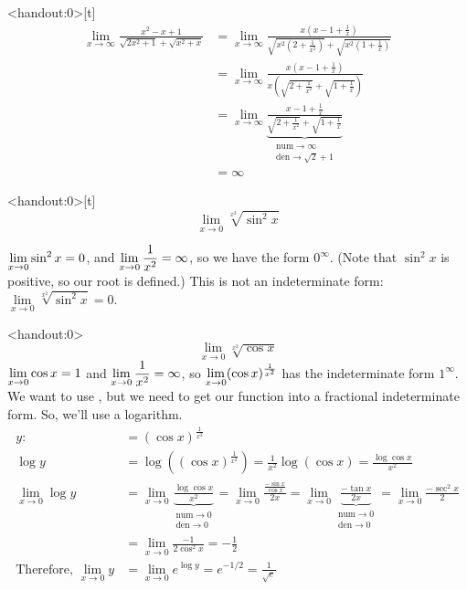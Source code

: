 \begin{frame}<handout:0>[t]
\color{answercolor}
\begin{align*}
\lim_{x \to \infty}
\frac{x^2-x+1}{\sqrt{2x^2+1}+\sqrt{x^2+x}}&=\lim_{x \to \infty}
\frac{x\left(x-1+\frac{1}{x}\right)}{\sqrt{x^2(2+\frac{1}{x^2})}+\sqrt{x^2(1+\frac{1}{x})}}\\
&=\lim_{x \to \infty}
\frac{x\left(x-1+\frac{1}{x}\right)}{x\left(\sqrt{2+\frac{1}{x^2}}+\sqrt{1+\frac{1}{x}}\right)}\\
&=\lim_{x \to \infty}
\underbrace{\frac{x-1+\frac{1}{x}}{\sqrt{2+\frac{1}{x^2}}+\sqrt{1+\frac{1}{x}}}}_{\substack
	{\mathrm{num}\to \infty\\
	 \mathrm{den}\to \sqrt{2}+1}}\\
&=\infty
\end{align*}
\color{answercolor}

\end{frame}
\begin{frame}<handout:0>[t]
\[\lim_{x \to 0}\sqrt[x^2]{\sin^2x}\]\pause


\color{answercolor}
 $\displaystyle\lim_{x \to 0} \sin^2 x = 0$, and $\displaystyle\lim_{x \to 0}\frac{1}{x^2}=\infty$, so we have the form $0^\infty$. (Note that $\sin^2 x$ is positive, so our root is defined.) This is not an indeterminate form: $\lim\limits_{x \to 0}\sqrt[x^2]{\sin^2 x}=0$.
\end{frame}
\begin{frame}<handout:0>
\[\lim_{x \to 0}\sqrt[x^2]{\cos x}\]\pause
\color{answercolor}
 $\displaystyle\lim_{x \to 0} \cos x =1$ and $\displaystyle\lim_{x \to 0}\frac{1}{x^2}=\infty$, so $\displaystyle\lim_{x \to 0}(\cos x)^{\frac{1}{x^2}}$ has the indeterminate form $1^\infty$. We want to use \hosp, but we need to get our function into a fractional indeterminate form. So, we'll use a logarithm.
\begin{align*}
y:&=(\cos x)^{\frac{1}{x^2}}\\
\log y &= \log \left((\cos x)^{\frac{1}{x^2}}\right)
=\frac{1}{x^2}\log(\cos x)=\frac{\log \cos x}{x^2}\\
\lim_{x \to 0}\log y &=\lim_{x \to 0}\underbrace{\frac{\log \cos x}{x^2}}_{\substack
	{\mathrm{num}\to0\\
	 \mathrm{den}\to 0}}
	=
	\lim_{x \to 0} \frac{\frac{-\sin x}{\cos x}}{2x}=
	\lim_{x \to 0} \underbrace{\frac{-\tan x}{2x}}_{\substack
	{\mathrm{num}\to0\\
	 \mathrm{den}\to 0}}
	=
	\lim_{x \to 0}\frac{-\sec^2x}{2}\\
	&=\lim_{x \to 0}\frac{-1}{2\cos^2 x}=-\frac{1}{2}\\
\mbox{Therefore, } \lim_{x \to 0} y &=\lim_{x \to 0}e^{\log y}=e^{-1/2}=\frac{1}{\sqrt{e}}
\end{align*}
\color{answercolor}

\end{frame}
